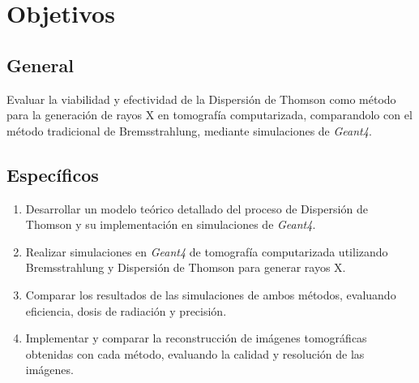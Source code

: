 \vspace*{\fill}


\section{Objetivos}

\subsection{General}
Evaluar la viabilidad y efectividad de la Dispersión de Thomson como método para la generación de rayos X en tomografía computarizada, comparandolo con el método tradicional de Bremsstrahlung, mediante simulaciones de \textit{Geant4}.

\subsection{Específicos}
\begin{enumerate}
    \item Desarrollar un modelo teórico detallado del proceso de Dispersión de Thomson y su implementación en simulaciones de \textit{Geant4}.
    \item Realizar simulaciones en \textit{Geant4} de tomografía computarizada utilizando Bremsstrahlung y Dispersión de Thomson para generar rayos X.
    \item Comparar los resultados de las simulaciones de ambos métodos, evaluando eficiencia, dosis de radiación y precisión.
    \item Implementar y comparar la reconstrucción de imágenes tomográficas obtenidas con cada método, evaluando la calidad y resolución de las imágenes.
\end{enumerate}


\vspace*{\fill}